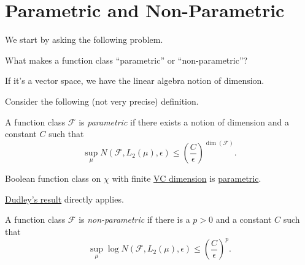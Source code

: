 \section{Parametric and Non-Parametric}
We start by asking the following problem.

\begin{problem*}
	What makes a function class ``parametric'' or ``non-parametric''?
\end{problem*}
\begin{answer}
	If it's a vector space, we have the linear algebra notion of dimension.
\end{answer}

Consider the following (not very precise) definition.

\begin{definition}[Parametric]\label{def:parametric}
	A function class \(\mathscr{F} \) is \emph{parametric} if there exists a notion of dimension and a constant \(C\) such that
	\[
		\sup _\mu N(\mathscr{F} , L_2(\mu ), \epsilon ) \leq \left( \frac{C}{\epsilon } \right) ^{\dim(\mathscr{F} )}.
	\]
\end{definition}

\begin{eg}
	Boolean function class on \(\chi \) with finite \hyperref[def:VC-dimension]{VC dimension} is \hyperref[def:parametric]{parametric}.
\end{eg}
\begin{explanation}
	\hyperref[thm:Dudley]{Dudley's result} directly applies.
\end{explanation}

\begin{definition}\label{def:non-parametric}
	A function class \(\mathscr{F} \) is \emph{non-parametric} if there is a \(p > 0\) and a constant \(C\) such that
	\[
		\sup _\mu \log N(\mathscr{F} , L_2(\mu ), \epsilon ) \leq \left( \frac{C}{\epsilon } \right) ^p.
	\]
\end{definition}


